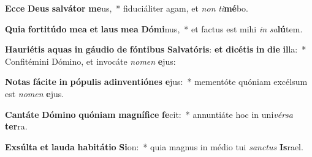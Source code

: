 \item \textbf{Ec}\textbf{ce} \textbf{De}\textbf{us} \textbf{sal}\textbf{vá}\textbf{tor} \textbf{me}us,~* fiduciáliter agam, et \textit{non} \textit{ti}\textbf{mé}bo.
\item \textbf{Qui}\textbf{a} \textbf{for}\textbf{ti}\textbf{tú}\textbf{do} \textbf{me}\textbf{a} \textbf{et} \textbf{laus} \textbf{me}\textbf{a} \textbf{Dó}\textbf{mi}nus,~* et factus est mihi \textit{in} \textit{sa}\textbf{lú}tem.
\item \textbf{Hau}\textbf{ri}\textbf{é}\textbf{tis} \textbf{a}\textbf{quas} \textbf{in} \textbf{gáu}\textbf{di}\textbf{o} \textbf{de} \textbf{fón}\textbf{ti}\textbf{bus} \textbf{Sal}\textbf{va}\textbf{tó}\textbf{ris}: \textbf{et} \textbf{di}\textbf{cé}\textbf{tis} \textbf{in} \textbf{di}\textbf{e} \textbf{il}la:~* Confitémini Dómino, et invocáte \textit{no}\textit{men} \textbf{e}jus:
\item \textbf{No}\textbf{tas} \textbf{fá}\textbf{ci}\textbf{te} \textbf{in} \textbf{pó}\textbf{pu}\textbf{lis} \textbf{ad}\textbf{in}\textbf{ven}\textbf{ti}\textbf{ó}\textbf{nes} \textbf{e}jus:~* mementóte quóniam excélsum est \textit{no}\textit{men} \textbf{e}jus.
\item \textbf{Can}\textbf{tá}\textbf{te} \textbf{Dó}\textbf{mi}\textbf{no} \textbf{quón}\textbf{i}\textbf{am} \textbf{ma}\textbf{gní}\textbf{fi}\textbf{ce} \textbf{fe}cit:~* annuntiáte hoc in uni\textit{vér}\textit{sa} \textbf{ter}ra.
\item \textbf{Ex}\textbf{súl}\textbf{ta} \textbf{et} \textbf{lau}\textbf{da} \textbf{ha}\textbf{bi}\textbf{tá}\textbf{ti}\textbf{o} \textbf{Si}on:~* quia magnus in médio tui \textit{sanc}\textit{tus} \textbf{Is}rael.
